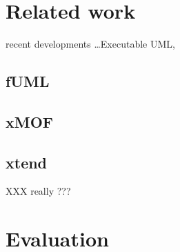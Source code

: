 \documentclass{llncs}
\begin{document}
\section{Related work}

 recent developments  \dots Executable UML, 

\subsection{fUML}
\subsection{xMOF}
\subsection{xtend}
XXX really ???





\section{Evaluation}
\end{document}
